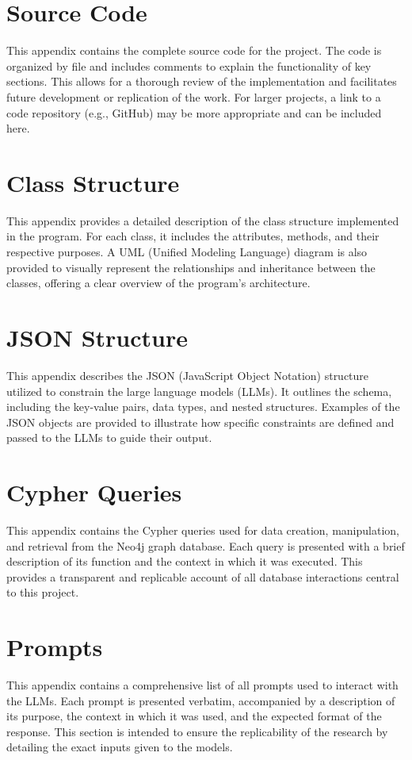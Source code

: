 \chapter{Source Code}
This appendix contains the complete source code for the project. The code is organized by file and includes comments to explain the functionality of key sections. This allows for a thorough review of the implementation and facilitates future development or replication of the work. For larger projects, a link to a code repository (e.g., GitHub) may be more appropriate and can be included here.

\chapter{Class Structure}
This appendix provides a detailed description of the class structure implemented in the program. For each class, it includes the attributes, methods, and their respective purposes. A UML (Unified Modeling Language) diagram is also provided to visually represent the relationships and inheritance between the classes, offering a clear overview of the program's architecture.

\chapter{JSON Structure}
This appendix describes the JSON (JavaScript Object Notation) structure utilized to constrain the large language models (LLMs). It outlines the schema, including the key-value pairs, data types, and nested structures. Examples of the JSON objects are provided to illustrate how specific constraints are defined and passed to the LLMs to guide their output.

\chapter{Cypher Queries}
This appendix contains the Cypher queries used for data creation, manipulation, and retrieval from the Neo4j graph database. Each query is presented with a brief description of its function and the context in which it was executed. This provides a transparent and replicable account of all database interactions central to this project.

\chapter{Prompts}
This appendix contains a comprehensive list of all prompts used to interact with the LLMs. Each prompt is presented verbatim, accompanied by a description of its purpose, the context in which it was used, and the expected format of the response. This section is intended to ensure the replicability of the research by detailing the exact inputs given to the models.

